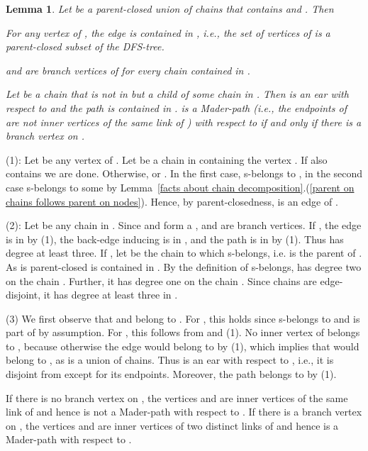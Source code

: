 \documentclass[paper=a4]{scrartcl}
\newtheorem{lemma}{Lemma}
\newcommand{\qed}{}
\newcommand{\mqed}{\hfill}
\newlength{\proofpostskipamount}\newlength{\proofpreskipamount}
\newenvironment{proof}{\par\vspace{\proofpreskipamount}\noindent{\textbf{Proof:}}\hspace{0.5em}}{\nopagebreak \strut\nopagebreak \hspace{\fill}\mqed\par\vspace{\proofpostskipamount}\noindent}
\begin{document}
\begin{lemma}\label{parent-closed union of chains}
Let  be a parent-closed union of chains that contains  and
. Then
\begin{compactenum}[(1)]
\item For any vertex  of , the edge  is contained in , i.e., the set of vertices of  is a parent-closed subset of the DFS-tree.
\item  and  are branch vertices of  for every chain  contained in .
\item Let  be a chain that is not in  but a child of some chain in . Then  is an ear with respect to  and the path  is contained in .  is a Mader-path (i.e., the endpoints of  are not inner vertices of the same link of ) with respect to  if and only if there is a branch vertex on .
\end{compactenum}
\end{lemma}
\begin{proof}
(1): Let  be any vertex of . Let  be a chain in  containing the vertex . If  also contains  we are done. Otherwise,  or . In the first case,  s-belongs to , in the second case  s-belongs to some  by Lemma~\ref{facts about chain decomposition}.(\ref{parent on chains follows parent on nodes}). Hence, by parent-closedness,  is an edge of .

(2): Let  be any chain in . Since  and  form a ,  and  are branch vertices. If , the edge  is in  by (1), the back-edge  inducing  is in , and the path  is in  by (1). Thus  has degree at least three. If , let  be the chain to which  s-belongs, i.e.  is the parent of . As  is parent-closed  is contained in . By the definition of s-belongs,  has degree two on the chain . Further, it has degree one on the chain . Since chains are edge-disjoint, it has degree at least three in .


(3) We first observe that  and  belong to . For , this holds since  s-belongs to  and  is part of  by assumption. For , this follows from  and (1). No inner vertex  of  belongs to , because otherwise the edge  would belong to  by (1), which implies that  would belong to , as  is a union of chains. Thus  is an ear with respect to , i.e., it is disjoint from  except for its endpoints. Moreover, the path  belongs to  by (1).

If there is no branch vertex on , the vertices  and  are inner vertices of the same link of  and hence  is not a Mader-path with respect to . If there is a branch vertex on , the vertices  and  are inner vertices of two distinct links of  and hence  is a Mader-path with respect to .
\qed
\end{proof}
\end{document}
